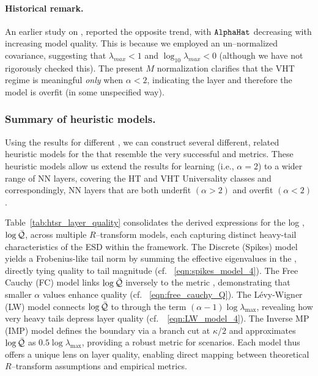\paragraph{Historical remark.}
An earlier study on \ALPHAHAT, reported the opposite trend, with $\texttt{AlphaHat}$ decreasing with increasing model quality.
This is because we employed an un–normalized covariance, suggesting that $\lambda_{max}<1$ and $\log_{10}\lambda_{max}<0$
(although we have not rigorously checked this).
The present $M$ normalization clarifies that the VHT regime is meaningful \emph{only} when $\alpha<2$,
indicating the layer and therefore the model is overfit (in some unspecified way).


\subsubsection{Summary of heuristic models.}
Using the results for different \RTransforms, we can construct several different, related heuristic models for the \LayerQuality
that resemble the very successful \WW \HTSR \ALPHA and \ALPHAHAT metrics.  These heuristic models allow us extend
the \SETOL results for \Ideal learning (i.e., $\alpha=2$) to a wider range of NN layers, covering the \HTSR
HT and VHT Universality classes and correspondingly, NN layers that are both underfit $(\alpha>2)$
and overfit $(\alpha<2)$.


Table~\ref{tab:htsr_layer_quality} consolidates the derived expressions for the log \LayerQuality, \(\log\bar{\mathcal{Q}}\), across multiple \(R\)–transform models, each capturing distinct heavy-tail characteristics of the ESD within the \SETOL framework. The Discrete (Spikes) model yields a Frobenius-like tail norm by summing the effective eigenvalues in the \ECS, directly tying quality to tail magnitude (cf. \EQN~\ref{eqn:spikes_model_4}). The Free Cauchy (FC) model links \(\log\bar{\mathcal{Q}}\) inversely to the \HTSR metric \ALPHA, demonstrating that smaller \(\alpha\) values enhance quality (cf. \EQN~\ref{eqn:free_cauchy_Q}). The L\'evy-Wigner (LW) model connects \(\log\bar{\mathcal{Q}}\) to \ALPHAHAT through the term \((\alpha-1)\log\lambda_{\max}\), revealing how very heavy tails depress layer quality (cf.\ \EQN~\ref{eqn:LW_model_4}). The Inverse MP (IMP) model defines the \ECS boundary via a branch cut at \(\kappa/2\) and approximates \(\log\bar{\mathcal{Q}}\) as \(0.5\log\lambda_{\max}\), providing a robust metric for \IdealLearning scenarios. Each model thus offers a unique lens on layer quality, enabling direct mapping between theoretical \(R\)–transform assumptions and empirical \WW metrics.

